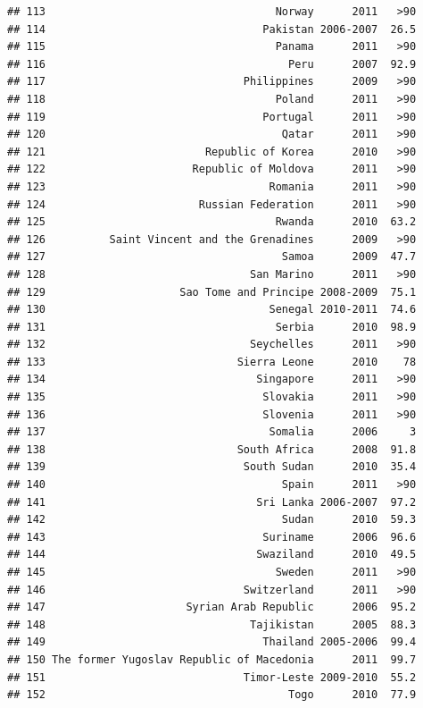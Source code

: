 \documentclass[
]{book}
\begin{document}
\begin{verbatim}
## 113                                    Norway      2011   >90
## 114                                  Pakistan 2006-2007  26.5
## 115                                    Panama      2011   >90
## 116                                      Peru      2007  92.9
## 117                               Philippines      2009   >90
## 118                                    Poland      2011   >90
## 119                                  Portugal      2011   >90
## 120                                     Qatar      2011   >90
## 121                         Republic of Korea      2010   >90
## 122                       Republic of Moldova      2011   >90
## 123                                   Romania      2011   >90
## 124                        Russian Federation      2011   >90
## 125                                    Rwanda      2010  63.2
## 126          Saint Vincent and the Grenadines      2009   >90
## 127                                     Samoa      2009  47.7
## 128                                San Marino      2011   >90
## 129                     Sao Tome and Principe 2008-2009  75.1
## 130                                   Senegal 2010-2011  74.6
## 131                                    Serbia      2010  98.9
## 132                                Seychelles      2011   >90
## 133                              Sierra Leone      2010    78
## 134                                 Singapore      2011   >90
## 135                                  Slovakia      2011   >90
## 136                                  Slovenia      2011   >90
## 137                                   Somalia      2006     3
## 138                              South Africa      2008  91.8
## 139                               South Sudan      2010  35.4
## 140                                     Spain      2011   >90
## 141                                 Sri Lanka 2006-2007  97.2
## 142                                     Sudan      2010  59.3
## 143                                  Suriname      2006  96.6
## 144                                 Swaziland      2010  49.5
## 145                                    Sweden      2011   >90
## 146                               Switzerland      2011   >90
## 147                      Syrian Arab Republic      2006  95.2
## 148                                Tajikistan      2005  88.3
## 149                                  Thailand 2005-2006  99.4
## 150 The former Yugoslav Republic of Macedonia      2011  99.7
## 151                               Timor-Leste 2009-2010  55.2
## 152                                      Togo      2010  77.9

\end{verbatim}
\end{document}
